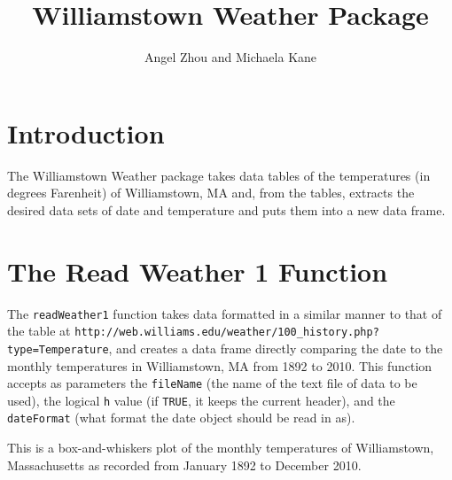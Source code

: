 \documentclass{article}\usepackage{graphicx, color}
\begin{document}
\title{Williamstown Weather Package}
\author{Angel Zhou and Michaela Kane}
\maketitle

\section*{Introduction}

The Williamstown Weather package takes data tables of the temperatures
(in degrees Farenheit) of Williamstown, MA and, from the tables,
extracts the desired data sets of date and temperature and puts them
into a new data frame.

\section*{The Read Weather 1 Function}
The \verb+readWeather1+ function takes data formatted in a similar
manner to that of the table at
\verb+http://web.williams.edu/weather/100_history.php?type=Temperature+, 
and creates a data frame directly comparing the date to the monthly
temperatures in Williamstown, MA from 1892 to 2010. This function
accepts as parameters the \verb+fileName+ (the name of the text file
of data to be used), the logical \verb+h+ value (if \verb+TRUE+, it
keeps the current header), and the \verb+dateFormat+ (what format the
date object should be read in as).

This is a box-and-whiskers plot of the monthly temperatures of
Williamstown, Massachusetts as recorded from January 1892 to December 2010.
\end{document}
